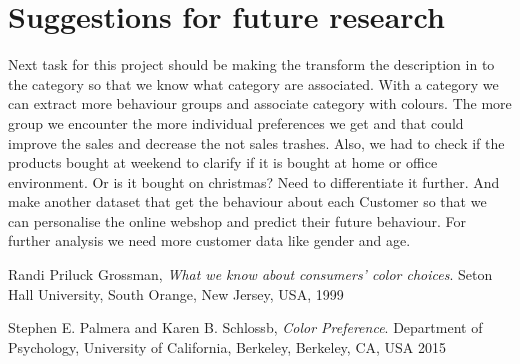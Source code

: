 \documentclass[11pt]{article}
\begin{document}
\section{Suggestions for future research}
Next task for this project should be making the transform the description in to the category so that we know what category are associated. With a category we can extract more behaviour groups and associate category with colours. The more group we encounter the more individual preferences we get and that could improve the sales and decrease the not sales trashes.
Also, we had to check if the products bought at weekend to clarify if it is bought at home or office environment. Or is it bought on christmas?
Need to differentiate it further. 
And make another dataset that get the behaviour about each Customer so that we can personalise the online webshop and predict their future behaviour. 
For further analysis we need more customer data like gender and age.



 
\begin{thebibliography}{9}

Randi Priluck Grossman,
\textit{What we know about consumers’ color choices}. 
Seton Hall University, South Orange, New Jersey, USA, 1999
 

Stephen E. Palmera and Karen B. Schlossb,
\textit{Color Preference}. 
Department of Psychology, University of California, Berkeley, Berkeley, CA, USA 2015
 
 
 
 \end{thebibliography}
 
 
\end{document}
